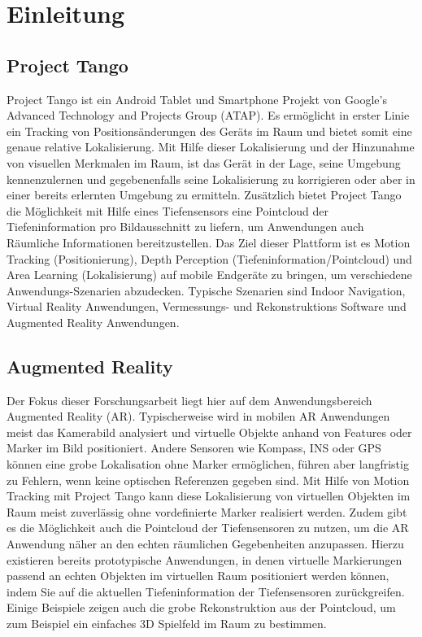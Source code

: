 \chapter{Einleitung}

\section{Project Tango}

Project Tango ist ein Android Tablet und Smartphone Projekt von Google’s Advanced Technology and Projects Group (ATAP). Es ermöglicht in erster Linie ein Tracking von Positionsänderungen des Geräts im Raum und bietet somit eine genaue relative Lokalisierung. Mit Hilfe dieser Lokalisierung und der Hinzunahme von visuellen Merkmalen im Raum, ist das Gerät in der Lage, seine Umgebung kennenzulernen und gegebenenfalls seine Lokalisierung zu korrigieren oder aber in einer bereits erlernten Umgebung zu ermitteln. Zusätzlich bietet Project Tango die Möglichkeit mit Hilfe eines Tiefensensors eine Pointcloud der Tiefeninformation pro Bildausschnitt zu liefern, um Anwendungen auch Räumliche Informationen bereitzustellen. Das Ziel dieser Plattform ist es Motion Tracking (Positionierung), Depth Perception (Tiefeninformation/Pointcloud) und Area Learning (Lokalisierung) auf mobile Endgeräte zu bringen, um verschiedene Anwendungs-Szenarien abzudecken. Typische Szenarien sind Indoor Navigation, Virtual Reality Anwendungen, Vermessungs- und Rekonstruktions Software und Augmented Reality Anwendungen.\\

\section{Augmented Reality}

Der Fokus dieser Forschungsarbeit liegt hier auf dem Anwendungsbereich Augmented Reality (AR). Typischerweise wird in mobilen AR Anwendungen meist das Kamerabild analysiert und virtuelle Objekte anhand von Features oder Marker im Bild positioniert. Andere Sensoren wie Kompass, INS oder GPS können eine grobe Lokalisation ohne Marker ermöglichen, führen aber langfristig zu Fehlern, wenn keine optischen Referenzen gegeben sind. Mit Hilfe von Motion Tracking mit Project Tango kann diese Lokalisierung von virtuellen Objekten im Raum meist zuverlässig ohne vordefinierte Marker realisiert werden. Zudem gibt es die Möglichkeit auch die Pointcloud der Tiefensensoren zu nutzen, um die AR Anwendung näher an den echten räumlichen Gegebenheiten anzupassen. Hierzu existieren bereits prototypische Anwendungen, in denen virtuelle Markierungen passend an echten Objekten im virtuellen Raum positioniert werden können, indem Sie auf die aktuellen Tiefeninformation der Tiefensensoren zurückgreifen. Einige Beispiele zeigen auch die grobe Rekonstruktion aus der Pointcloud, um zum Beispiel ein einfaches 3D Spielfeld im Raum zu bestimmen.\\

